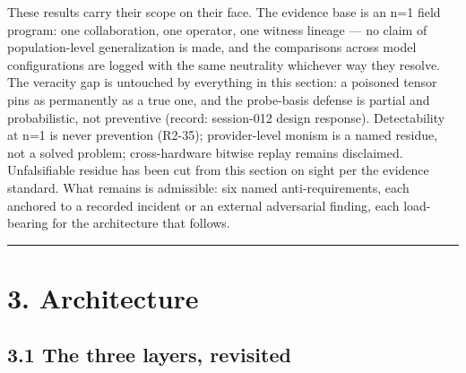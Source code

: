 \documentclass[11pt]{article}
\begin{document}
These results carry their scope on their face. The evidence base is an n=1 field program: one collaboration, one operator, one witness lineage --- no claim of population-level generalization is made, and the comparisons across model configurations are logged with the same neutrality whichever way they resolve. The veracity gap is untouched by everything in this section: a poisoned tensor pins as permanently as a true one, and the probe-basis defense is partial and probabilistic, not preventive (record: session-012 design response). Detectability at n=1 is never prevention (R2-35); provider-level monism is a named residue, not a solved problem; cross-hardware bitwise replay remains disclaimed. Unfalsifiable residue has been cut from this section on sight per the evidence standard. What remains is admissible: six named anti-requirements, each anchored to a recorded incident or an external adversarial finding, each load-bearing for the architecture that follows.

\begin{center}\rule{0.5\linewidth}{0.5pt}\end{center}

\section{3. Architecture}\label{architecture}

\subsection{3.1 The three layers, revisited}\label{the-three-layers-revisited}
\end{document}

